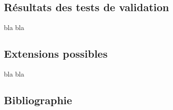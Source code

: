 \begin{titlepage}
{}


\newpage
\begin{center}
\begin{bf}
\section{Résultats des tests de validation}
\end{bf}
\end{center}

\vspace{1cm}
{
bla bla
}


\newpage
\begin{center}
\begin{bf}
\section{Extensions possibles}
\end{bf}
\end{center}

\vspace{1cm}
{
bla bla
}


\newpage
\begin{center}
\begin{bf}
\section{Bibliographie}
\end{bf}
\end{center}
 
	
\end{titlepage}
